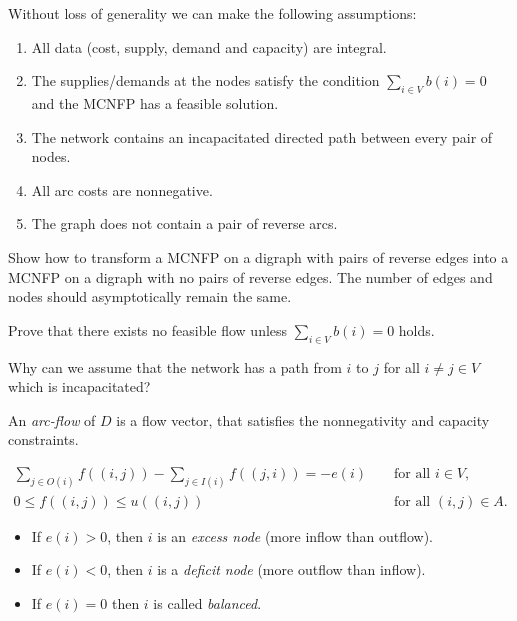   
  Without loss of generality we can make the following assumptions: 
  
  \begin{enumerate}
  \item All data (cost, supply, demand and capacity) are integral.
  \item The supplies/demands at the nodes satisfy the condition 
    $\sum_{i \in V} b(i)=0$ and the MCNFP has a feasible solution. 
  \item The network contains an incapacitated directed path between
    every pair of nodes. 
  \item All arc costs are nonnegative. 
  \item The graph does not contain a pair of reverse arcs. 
  \end{enumerate}
  
  \begin{exercise}
    Show how to transform a MCNFP on a digraph with pairs of reverse
    edges into a MCNFP on a digraph with no pairs of reverse
    edges.  The number of edges and nodes should asymptotically remain
    the same. 
  \end{exercise}
  

  \begin{exercise}
    Prove that there exists no feasible flow unless $\sum_{i \in V} b(i)=0$
    holds. 
  \end{exercise}

  \begin{exercise}
    Why can we assume that the network has a path from $i$ to $j$ for
    all $i\neq j\in V$   which is incapacitated?
  \end{exercise}

  
  An \emph{arc-flow} of $D$ is a flow vector, that satisfies the
  nonnegativity and capacity constraints. 
 
  \begin{eqnarray*}
        \sum_{j \in O(i)} f((i,j)) - \sum_{j\in I(i)} f((j,i)) = - e(i) & &   \text{ for all } i \in V,\\
        0 \leq f((i,j)) \leq u((i,j))                 & &   \text{ for all }
        (i,j) \in A. 
  \end{eqnarray*}


  \begin{itemize}
  \item  If $e(i) >0$, then $i$ is an \emph{excess node} (more inflow than
    outflow).
  \item If $e(i) <0$, then $i$ is a \emph{deficit node} (more outflow than
    inflow).
  \item  If $e(i) = 0$ then $i$ is called \emph{balanced}.
  \end{itemize}
  
